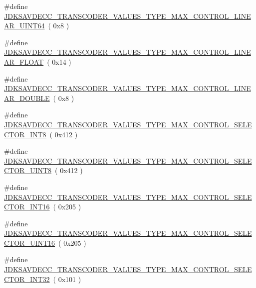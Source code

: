 \begin{DoxyCompactItemize}
\item 
\#define \hyperlink{group__transcoder__values__type__max_ga52c139058a61cc9e1dde0e9449e83901}{J\+D\+K\+S\+A\+V\+D\+E\+C\+C\+\_\+\+T\+R\+A\+N\+S\+C\+O\+D\+E\+R\+\_\+\+V\+A\+L\+U\+E\+S\+\_\+\+T\+Y\+P\+E\+\_\+\+M\+A\+X\+\_\+\+C\+O\+N\+T\+R\+O\+L\+\_\+\+L\+I\+N\+E\+A\+R\+\_\+\+U\+I\+N\+T64}~( 0x8 )
\item 
\#define \hyperlink{group__transcoder__values__type__max_gade7127a0267cb8cd50e351048abfde5a}{J\+D\+K\+S\+A\+V\+D\+E\+C\+C\+\_\+\+T\+R\+A\+N\+S\+C\+O\+D\+E\+R\+\_\+\+V\+A\+L\+U\+E\+S\+\_\+\+T\+Y\+P\+E\+\_\+\+M\+A\+X\+\_\+\+C\+O\+N\+T\+R\+O\+L\+\_\+\+L\+I\+N\+E\+A\+R\+\_\+\+F\+L\+O\+AT}~( 0x14 )
\item 
\#define \hyperlink{group__transcoder__values__type__max_ga3764018df9f68ee6d149cfdf505255ea}{J\+D\+K\+S\+A\+V\+D\+E\+C\+C\+\_\+\+T\+R\+A\+N\+S\+C\+O\+D\+E\+R\+\_\+\+V\+A\+L\+U\+E\+S\+\_\+\+T\+Y\+P\+E\+\_\+\+M\+A\+X\+\_\+\+C\+O\+N\+T\+R\+O\+L\+\_\+\+L\+I\+N\+E\+A\+R\+\_\+\+D\+O\+U\+B\+LE}~( 0x8 )
\item 
\#define \hyperlink{group__transcoder__values__type__max_ga0049784378c757d3c7c2f0cbd50d50e1}{J\+D\+K\+S\+A\+V\+D\+E\+C\+C\+\_\+\+T\+R\+A\+N\+S\+C\+O\+D\+E\+R\+\_\+\+V\+A\+L\+U\+E\+S\+\_\+\+T\+Y\+P\+E\+\_\+\+M\+A\+X\+\_\+\+C\+O\+N\+T\+R\+O\+L\+\_\+\+S\+E\+L\+E\+C\+T\+O\+R\+\_\+\+I\+N\+T8}~( 0x412 )
\item 
\#define \hyperlink{group__transcoder__values__type__max_gacd928d772de1f845fe4d6a21cd1f3661}{J\+D\+K\+S\+A\+V\+D\+E\+C\+C\+\_\+\+T\+R\+A\+N\+S\+C\+O\+D\+E\+R\+\_\+\+V\+A\+L\+U\+E\+S\+\_\+\+T\+Y\+P\+E\+\_\+\+M\+A\+X\+\_\+\+C\+O\+N\+T\+R\+O\+L\+\_\+\+S\+E\+L\+E\+C\+T\+O\+R\+\_\+\+U\+I\+N\+T8}~( 0x412 )
\item 
\#define \hyperlink{group__transcoder__values__type__max_gaf4914777eb4c75512105200d802f8e62}{J\+D\+K\+S\+A\+V\+D\+E\+C\+C\+\_\+\+T\+R\+A\+N\+S\+C\+O\+D\+E\+R\+\_\+\+V\+A\+L\+U\+E\+S\+\_\+\+T\+Y\+P\+E\+\_\+\+M\+A\+X\+\_\+\+C\+O\+N\+T\+R\+O\+L\+\_\+\+S\+E\+L\+E\+C\+T\+O\+R\+\_\+\+I\+N\+T16}~( 0x205 )
\item 
\#define \hyperlink{group__transcoder__values__type__max_ga7d3e37bdeda7c1e127f792c0b8d65927}{J\+D\+K\+S\+A\+V\+D\+E\+C\+C\+\_\+\+T\+R\+A\+N\+S\+C\+O\+D\+E\+R\+\_\+\+V\+A\+L\+U\+E\+S\+\_\+\+T\+Y\+P\+E\+\_\+\+M\+A\+X\+\_\+\+C\+O\+N\+T\+R\+O\+L\+\_\+\+S\+E\+L\+E\+C\+T\+O\+R\+\_\+\+U\+I\+N\+T16}~( 0x205 )
\item 
\#define \hyperlink{group__transcoder__values__type__max_ga16a77bc950fb7d2ebf4b407bf776c3ad}{J\+D\+K\+S\+A\+V\+D\+E\+C\+C\+\_\+\+T\+R\+A\+N\+S\+C\+O\+D\+E\+R\+\_\+\+V\+A\+L\+U\+E\+S\+\_\+\+T\+Y\+P\+E\+\_\+\+M\+A\+X\+\_\+\+C\+O\+N\+T\+R\+O\+L\+\_\+\+S\+E\+L\+E\+C\+T\+O\+R\+\_\+\+I\+N\+T32}~( 0x101 )

\end{DoxyCompactItemize}
